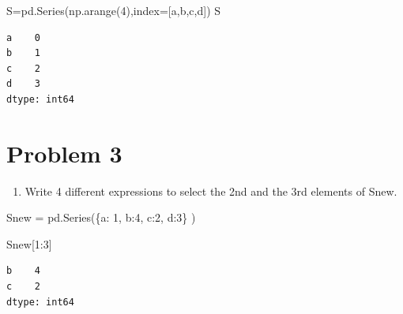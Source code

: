 \documentclass[
  a4paper,
  DIV=11,
  numbers=noendperiod]{scrreprt}
\newenvironment{Shaded}{\begin{snugshade}}{\end{snugshade}}
\newcommand{\DecValTok}[1]{\textcolor[rgb]{0.68,0.00,0.00}{#1}}
\newcommand{\NormalTok}[1]{\textcolor[rgb]{0.00,0.23,0.31}{#1}}
\newcommand{\OperatorTok}[1]{\textcolor[rgb]{0.37,0.37,0.37}{#1}}
\newcommand{\StringTok}[1]{\textcolor[rgb]{0.13,0.47,0.30}{#1}}
\providecommand{\tightlist}{%
  \setlength{\itemsep}{0pt}\setlength{\parskip}{0pt}}\usepackage{longtable,booktabs,array}
\begin{document}
\begin{Shaded}
\begin{Highlighting}[]
\NormalTok{S}\OperatorTok{=}\NormalTok{pd.Series(np.arange(}\DecValTok{4}\NormalTok{),index}\OperatorTok{=}\NormalTok{[}\StringTok{\textquotesingle{}a\textquotesingle{}}\NormalTok{,}\StringTok{\textquotesingle{}b\textquotesingle{}}\NormalTok{,}\StringTok{\textquotesingle{}c\textquotesingle{}}\NormalTok{,}\StringTok{\textquotesingle{}d\textquotesingle{}}\NormalTok{])}
\NormalTok{S}
\end{Highlighting}
\end{Shaded}

\begin{verbatim}
a    0
b    1
c    2
d    3
dtype: int64
\end{verbatim}

\section*{Problem 3}\label{problem-3}


\begin{enumerate}
\def\labelenumi{\arabic{enumi}.}
\setcounter{enumi}{2}
\tightlist
\item
  Write 4 different expressions to select the 2nd and the 3rd elements
  of Snew.
\end{enumerate}

\begin{Shaded}
\begin{Highlighting}[]
\NormalTok{Snew }\OperatorTok{=}\NormalTok{ pd.Series(\{}\StringTok{\textquotesingle{}a\textquotesingle{}}\NormalTok{: }\DecValTok{1}\NormalTok{, }\StringTok{\textquotesingle{}b\textquotesingle{}}\NormalTok{:}\DecValTok{4}\NormalTok{, }\StringTok{\textquotesingle{}c\textquotesingle{}}\NormalTok{:}\DecValTok{2}\NormalTok{, }\StringTok{\textquotesingle{}d\textquotesingle{}}\NormalTok{:}\DecValTok{3}\NormalTok{\} )}
\end{Highlighting}
\end{Shaded}

\begin{Shaded}
\begin{Highlighting}[]
\NormalTok{Snew[}\DecValTok{1}\NormalTok{:}\DecValTok{3}\NormalTok{]}
\end{Highlighting}
\end{Shaded}

\begin{verbatim}
b    4
c    2
dtype: int64
\end{verbatim}
\end{document}
